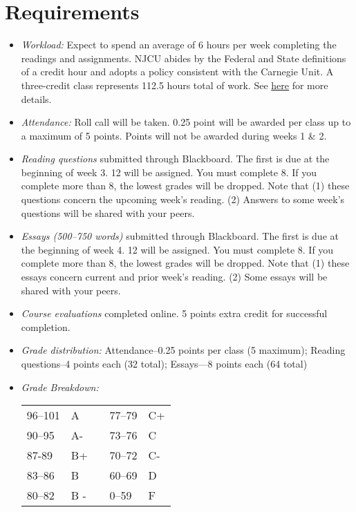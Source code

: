 \documentclass[article,oneside]{memoir}
\begin{document}
\section{Requirements}


\begin{itemize}
\item \textit{Workload:} Expect to spend an average of 6 hours per week completing the readings and assignments. NJCU abides by the Federal and State definitions of a credit hour and adopts a policy consistent with the Carnegie Unit. A three-credit class represents 112.5 hours total of work. See \href{http://scoconno.github.io/Teaching/Credit.pdf}{here} for more details.

\item \textit{Attendance:} Roll call will be taken. 0.25 point will be awarded per class up to a maximum of 5 points. Points will not be awarded during weeks 1 \& 2. 

\item \textit{Reading questions} submitted through Blackboard. The first is due at the beginning of week 3. 12 will be assigned. You must complete 8. If you complete more than 8, the lowest grades will be dropped.  Note that (1) these questions concern the upcoming week's reading. (2) Answers to some week's questions will be shared with your peers.

\item \textit{Essays (500--750 words)} submitted through Blackboard. The first is due at the beginning of week 4.  12 will be assigned. You must complete 8. If you complete more than 8, the lowest grades will be dropped. Note that (1) these essays concern current and prior week's reading. (2) Some essays will be shared with your peers.


\item \textit{Course evaluations} completed online. 5 points extra credit for successful completion.
  
\item \textit{Grade distribution:} Attendance--0.25 points per class (5 maximum);   Reading questions--4 points each (32 total); Essays---8 points each (64 total)

\item \textit{Grade Breakdown:}

 \begin{tabular}{ | l | l | p{2cm} | l | l | }
    \hline 
96--101 & A  & &  77--79 &  C+ \\  
90--95 & A- & &  73--76 & C \\
87-89 & B+ &  &  70--72 & C- \\ 
83--86 & B  & &  60--69 & D\\
80--82 & B - & & 0--59 & F\\ \hline
    \end{tabular}


\end{itemize}
\end{document}
